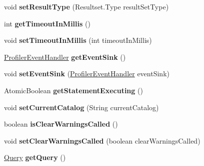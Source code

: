 \begin{DoxyCompactItemize}
void {\bfseries set\+Result\+Type} (Resultset.\+Type result\+Set\+Type)
\item 
\mbox{\label{classcom_1_1mysql_1_1cj_1_1jdbc_1_1_statement_impl_ae819d62406476bbeb71be402eff8f619}} 
int {\bfseries get\+Timeout\+In\+Millis} ()
\item 
\mbox{\label{classcom_1_1mysql_1_1cj_1_1jdbc_1_1_statement_impl_a88a77da140cb220313f9f876f08ee0a1}} 
void {\bfseries set\+Timeout\+In\+Millis} (int timeout\+In\+Millis)
\item 
\mbox{\label{classcom_1_1mysql_1_1cj_1_1jdbc_1_1_statement_impl_a718d61ccf9261f402e7d28a295aca55c}} 
\mbox{\hyperlink{interfacecom_1_1mysql_1_1cj_1_1log_1_1_profiler_event_handler}{Profiler\+Event\+Handler}} {\bfseries get\+Event\+Sink} ()
\item 
\mbox{\label{classcom_1_1mysql_1_1cj_1_1jdbc_1_1_statement_impl_a7f46764af12c9648ac8ac2929b275fd4}} 
void {\bfseries set\+Event\+Sink} (\mbox{\hyperlink{interfacecom_1_1mysql_1_1cj_1_1log_1_1_profiler_event_handler}{Profiler\+Event\+Handler}} event\+Sink)
\item 
\mbox{\label{classcom_1_1mysql_1_1cj_1_1jdbc_1_1_statement_impl_ab253ad63963434ee5cde7ca8e68f7ff6}} 
Atomic\+Boolean {\bfseries get\+Statement\+Executing} ()
\item 
\mbox{\label{classcom_1_1mysql_1_1cj_1_1jdbc_1_1_statement_impl_a30dda4ad8c6bc0be8eb3c926c9a1e0f1}} 
void {\bfseries set\+Current\+Catalog} (String current\+Catalog)
\item 
\mbox{\label{classcom_1_1mysql_1_1cj_1_1jdbc_1_1_statement_impl_a63d97344f6b1ebede1e07b71d13a923d}} 
boolean {\bfseries is\+Clear\+Warnings\+Called} ()
\item 
\mbox{\label{classcom_1_1mysql_1_1cj_1_1jdbc_1_1_statement_impl_a6e7f50419ea0c769393113fde7de7b87}} 
void {\bfseries set\+Clear\+Warnings\+Called} (boolean clear\+Warnings\+Called)
\item 
\mbox{\label{classcom_1_1mysql_1_1cj_1_1jdbc_1_1_statement_impl_a03be1a8bab079e9da100366153fc4238}} 
\mbox{\hyperlink{interfacecom_1_1mysql_1_1cj_1_1_query}{Query}} {\bfseries get\+Query} ()
\end{DoxyCompactItemize}
